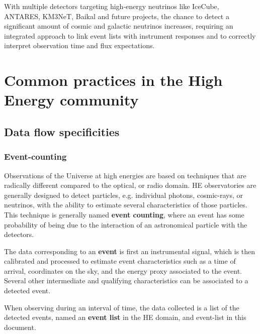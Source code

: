 \documentclass[11pt,a4paper]{ivoa}
\begin{document}
With multiple detectors targeting high-energy neutrinos like IceCube, ANTARES, KM3NeT, Baikal and future projects, the chance to detect a significant amount of cosmic and galactic neutrinos increases, requiring an integrated approach to link event lists with instrument responses and to correctly interpret observation time and flux expectations.









\section{Common practices in the High Energy community}

\subsection{Data flow specificities}

\subsubsection{Event-counting}

Observations of the Universe at high energies are based on techniques that are radically different compared to the optical, or radio domain. HE observatories are generally designed to detect particles, e.g. individual photons, cosmic-rays, or neutrinos, with the ability to estimate several characteristics of those particles. This technique is generally named \textbf{event counting}, where an event has some probability of being due to the interaction of an astronomical particle with the detectors.

The data corresponding to an \textbf{event} is first an instrumental signal, which is then calibrated and processed to estimate event characteristics such as a time of arrival, coordinates on the sky, and the energy proxy associated to the event. Several other intermediate and qualifying characteristics can be associated to a detected event.

When observing during an interval of time, the data collected is a list of the detected events, named an \textbf{event list} in the HE domain, and event-list in this document.
\end{document}
